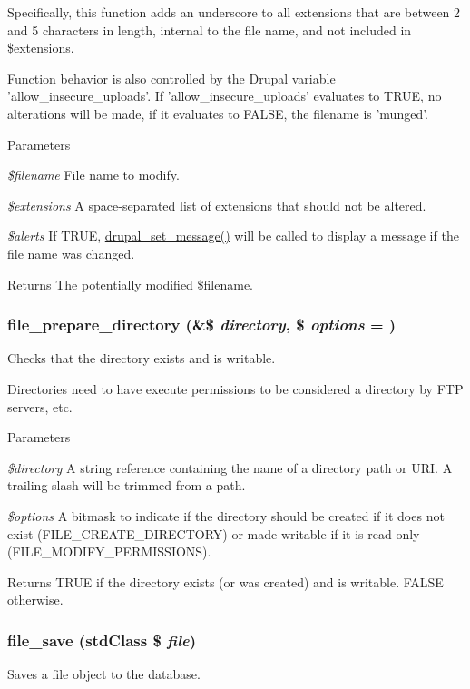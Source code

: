 Specifically, this function adds an underscore to all extensions that are between 2 and 5 characters in length, internal to the file name, and not included in \$extensions.

Function behavior is also controlled by the Drupal variable 'allow\_\-insecure\_\-uploads'. If 'allow\_\-insecure\_\-uploads' evaluates to TRUE, no alterations will be made, if it evaluates to FALSE, the filename is 'munged'.


\begin{DoxyParams}{Parameters}
\item[{\em \$filename}]File name to modify. \item[{\em \$extensions}]A space-\/separated list of extensions that should not be altered. \item[{\em \$alerts}]If TRUE, \hyperlink{bootstrap_8inc_ad9223d86c7b08b1288274ce211d9bfa6}{drupal\_\-set\_\-message()} will be called to display a message if the file name was changed.\end{DoxyParams}
\begin{DoxyReturn}{Returns}
The potentially modified \$filename. 
\end{DoxyReturn}
\hypertarget{group__file_ga738f89421a4f4c228676de817e5e485c}{
\subsubsection[{file\_\-prepare\_\-directory}]{\setlength{\rightskip}{0pt plus 5cm}file\_\-prepare\_\-directory (\&\$ {\em directory}, \/  \$ {\em options} = {})}}
\label{group__file_ga738f89421a4f4c228676de817e5e485c}
Checks that the directory exists and is writable.

Directories need to have execute permissions to be considered a directory by FTP servers, etc.


\begin{DoxyParams}{Parameters}
\item[{\em \$directory}]A string reference containing the name of a directory path or URI. A trailing slash will be trimmed from a path. \item[{\em \$options}]A bitmask to indicate if the directory should be created if it does not exist (FILE\_\-CREATE\_\-DIRECTORY) or made writable if it is read-\/only (FILE\_\-MODIFY\_\-PERMISSIONS).\end{DoxyParams}
\begin{DoxyReturn}{Returns}
TRUE if the directory exists (or was created) and is writable. FALSE otherwise. 
\end{DoxyReturn}
\hypertarget{group__file_ga80327cb23d8d384b827b2637cd8cc4ba}{
\subsubsection[{file\_\-save}]{\setlength{\rightskip}{0pt plus 5cm}file\_\-save (stdClass \$ {\em file})}}
\label{group__file_ga80327cb23d8d384b827b2637cd8cc4ba}
Saves a file object to the database.

